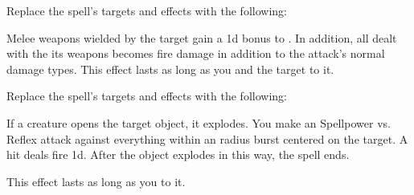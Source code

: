 


Replace the spell's targets and effects with the following:
\begin{spellcontent}

\begin{augmenttargetinginfo}



\end{augmenttargetinginfo}


\begin{augmenteffects}



\spelleffect
Melee weapons wielded by the target gain a \plus1d bonus to .
In addition, all  dealt with the its weapons becomes fire damage in addition to the attack's normal damage types.
This effect lasts as long as you and the target  to it.








\end{augmenteffects}

\end{spellcontent}








Replace the spell's targets and effects with the following:
\begin{spellcontent}

\begin{augmenttargetinginfo}




\end{augmenttargetinginfo}


\begin{augmenteffects}



\spelleffect
If a creature opens the target object, it explodes.
You make an Spellpower vs. Reflex attack against everything within an \areamed radius burst centered on the target.
A hit deals fire  \minus1d.
After the object explodes in this way, the spell ends.

This effect lasts as long as you  to it.








\end{augmenteffects}

\end{spellcontent}





